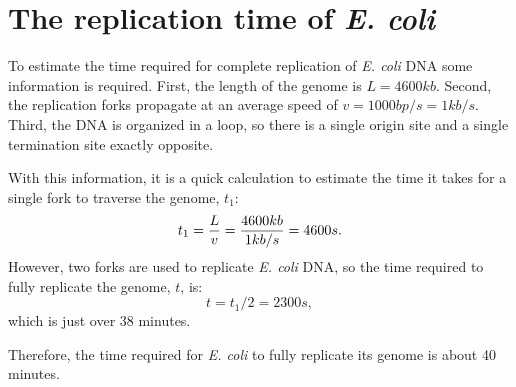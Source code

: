 \chapter{The replication time of \emph{E. coli}}
\label{ap:EColi}

To estimate the time required for complete replication of \emph{E. coli} DNA some information is required.
First, the length of the genome is $L = 4600 kb$.
Second, the replication forks propagate at an average speed of $v = 1000 bp/s = 1 kb/s$.
Third, the DNA is organized in a loop, so there is a single origin site and a single termination site exactly opposite. \cite{EColi}

With this information, it is a quick calculation to estimate the time it takes for a single fork to traverse the genome, $t_1$:
$$
	t_1 = {{L}\over{v}} = {{4600 kb}\over{1 kb/s}} = 4600 s.
$$
However, two forks are used to replicate \emph{E. coli} DNA, so the time required to fully replicate the genome, $t$, is:
$$
	t = t_1/2 = 2300 s,
$$
which is just over 38 minutes.

Therefore, the time required for \emph{E. coli} to fully replicate its genome is about 40 minutes.
